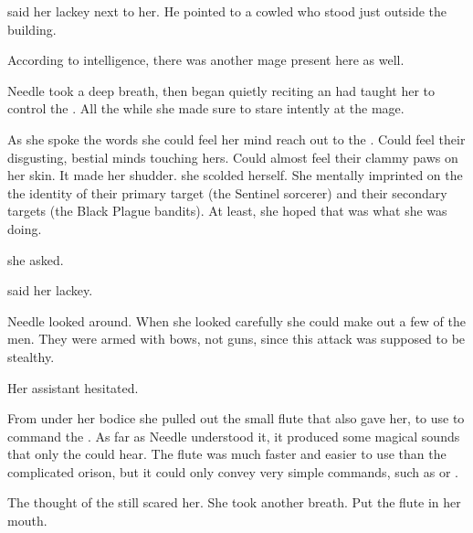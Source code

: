  said her lackey next to her. 
He pointed to a cowled \dax{} who stood just outside the building. 

According to intelligence, there was another mage present here as well. 

Needle took a deep breath, then began quietly reciting an  \Achsah{} had taught her to control the \grimrats.
All the while she made sure to stare intently at the mage. 

As she spoke the words she could feel her mind reach out to the \banerats. 
Could feel their disgusting, bestial minds touching hers. 
Could almost feel their clammy paws on her skin. 
It made her shudder. 
 she scolded herself. 
She mentally imprinted on the \banerats{} the identity of their primary target (the Sentinel sorcerer) and their secondary targets (the Black Plague bandits). 
At least, she hoped that was what she was doing. 

 she asked. 

 said her lackey.

Needle looked around. 
When she looked carefully she could make out a few of the men. 
They were armed with bows, not guns, since this attack was supposed to be stealthy. 

Her assistant hesitated. 


From under her bodice she pulled out the small flute that \Achsah{} also gave her, to use to command the . 
As far as Needle understood it, it produced some magical sounds that only the \grimrats{} could hear. 
The flute was much faster and easier to use than the complicated orison, but it could only convey very simple commands, such as  or . 

The thought of the \grimrats{} still scared her. 
She took another breath. 
Put the flute in her mouth. 

